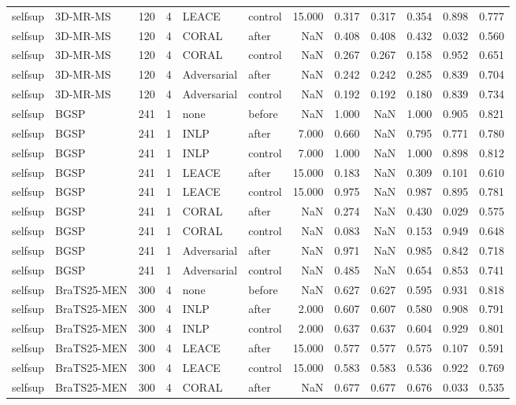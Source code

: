 \begin{tabular}{llrrllrrrrrr}
selfsup & 3D-MR-MS & 120 & 4 & LEACE & control & 15.000 & 0.317 & 0.317 & 0.354 & 0.898 & 0.777 \\
selfsup & 3D-MR-MS & 120 & 4 & CORAL & after & NaN & 0.408 & 0.408 & 0.432 & 0.032 & 0.560 \\
selfsup & 3D-MR-MS & 120 & 4 & CORAL & control & NaN & 0.267 & 0.267 & 0.158 & 0.952 & 0.651 \\
selfsup & 3D-MR-MS & 120 & 4 & Adversarial & after & NaN & 0.242 & 0.242 & 0.285 & 0.839 & 0.704 \\
selfsup & 3D-MR-MS & 120 & 4 & Adversarial & control & NaN & 0.192 & 0.192 & 0.180 & 0.839 & 0.734 \\
selfsup & BGSP & 241 & 1 & none & before & NaN & 1.000 & NaN & 1.000 & 0.905 & 0.821 \\
selfsup & BGSP & 241 & 1 & INLP & after & 7.000 & 0.660 & NaN & 0.795 & 0.771 & 0.780 \\
selfsup & BGSP & 241 & 1 & INLP & control & 7.000 & 1.000 & NaN & 1.000 & 0.898 & 0.812 \\
selfsup & BGSP & 241 & 1 & LEACE & after & 15.000 & 0.183 & NaN & 0.309 & 0.101 & 0.610 \\
selfsup & BGSP & 241 & 1 & LEACE & control & 15.000 & 0.975 & NaN & 0.987 & 0.895 & 0.781 \\
selfsup & BGSP & 241 & 1 & CORAL & after & NaN & 0.274 & NaN & 0.430 & 0.029 & 0.575 \\
selfsup & BGSP & 241 & 1 & CORAL & control & NaN & 0.083 & NaN & 0.153 & 0.949 & 0.648 \\
selfsup & BGSP & 241 & 1 & Adversarial & after & NaN & 0.971 & NaN & 0.985 & 0.842 & 0.718 \\
selfsup & BGSP & 241 & 1 & Adversarial & control & NaN & 0.485 & NaN & 0.654 & 0.853 & 0.741 \\
selfsup & BraTS25-MEN & 300 & 4 & none & before & NaN & 0.627 & 0.627 & 0.595 & 0.931 & 0.818 \\
selfsup & BraTS25-MEN & 300 & 4 & INLP & after & 2.000 & 0.607 & 0.607 & 0.580 & 0.908 & 0.791 \\
selfsup & BraTS25-MEN & 300 & 4 & INLP & control & 2.000 & 0.637 & 0.637 & 0.604 & 0.929 & 0.801 \\
selfsup & BraTS25-MEN & 300 & 4 & LEACE & after & 15.000 & 0.577 & 0.577 & 0.575 & 0.107 & 0.591 \\
selfsup & BraTS25-MEN & 300 & 4 & LEACE & control & 15.000 & 0.583 & 0.583 & 0.536 & 0.922 & 0.769 \\
selfsup & BraTS25-MEN & 300 & 4 & CORAL & after & NaN & 0.677 & 0.677 & 0.676 & 0.033 & 0.535 \\

\end{tabular}
